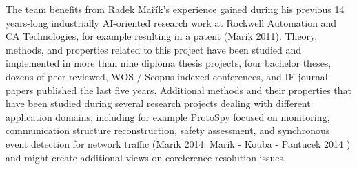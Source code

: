 The team benefits from Radek Mařík's experience gained during his previous 14 years-long industrially AI-oriented research work at Rockwell Automation and CA Technologies, for example resulting in a patent (Marik 2011). Theory, methods, and properties related to this project have been studied and implemented in more than nine diploma thesis projects, four bachelor theses, dozens of peer-reviewed, WOS / Scopus indexed conferences, and IF journal papers published the last five years. Additional methods and their properties that have been studied during several research projects dealing with different application domains, including for example ProtoSpy focused on monitoring, communication structure reconstruction, safety assessment, and synchronous event detection for network traffic (Marik 2014; Marik - Kouba - Pantucek 2014 ) and might create additional views on coreference resolution issues.

